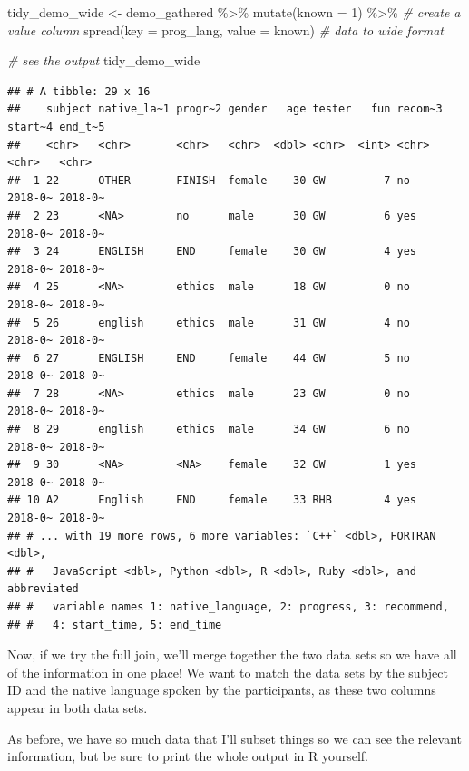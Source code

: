 \documentclass[
]{book}
\newenvironment{Shaded}{\begin{snugshade}}{\end{snugshade}}
\newcommand{\AttributeTok}[1]{\textcolor[rgb]{0.77,0.63,0.00}{#1}}
\newcommand{\CommentTok}[1]{\textcolor[rgb]{0.56,0.35,0.01}{\textit{#1}}}
\newcommand{\DecValTok}[1]{\textcolor[rgb]{0.00,0.00,0.81}{#1}}
\newcommand{\FunctionTok}[1]{\textcolor[rgb]{0.00,0.00,0.00}{#1}}
\newcommand{\NormalTok}[1]{#1}
\newcommand{\OtherTok}[1]{\textcolor[rgb]{0.56,0.35,0.01}{#1}}
\newcommand{\SpecialCharTok}[1]{\textcolor[rgb]{0.00,0.00,0.00}{#1}}
\begin{document}
\begin{Shaded}
\begin{Highlighting}[]
\NormalTok{tidy\_demo\_wide }\OtherTok{\textless{}{-}}\NormalTok{ demo\_gathered }\SpecialCharTok{\%\textgreater{}\%} 
  \FunctionTok{mutate}\NormalTok{(}\AttributeTok{known =} \DecValTok{1}\NormalTok{) }\SpecialCharTok{\%\textgreater{}\%} \CommentTok{\# create a value column}
  \FunctionTok{spread}\NormalTok{(}\AttributeTok{key =}\NormalTok{ prog\_lang, }\AttributeTok{value =}\NormalTok{ known) }\CommentTok{\# data to wide format}

\CommentTok{\# see the output}
\NormalTok{tidy\_demo\_wide}
\end{Highlighting}
\end{Shaded}

\begin{verbatim}
## # A tibble: 29 x 16
##    subject native_la~1 progr~2 gender   age tester   fun recom~3 start~4 end_t~5
##    <chr>   <chr>       <chr>   <chr>  <dbl> <chr>  <int> <chr>   <chr>   <chr>  
##  1 22      OTHER       FINISH  female    30 GW         7 no      2018-0~ 2018-0~
##  2 23      <NA>        no      male      30 GW         6 yes     2018-0~ 2018-0~
##  3 24      ENGLISH     END     female    30 GW         4 yes     2018-0~ 2018-0~
##  4 25      <NA>        ethics  male      18 GW         0 no      2018-0~ 2018-0~
##  5 26      english     ethics  male      31 GW         4 no      2018-0~ 2018-0~
##  6 27      ENGLISH     END     female    44 GW         5 no      2018-0~ 2018-0~
##  7 28      <NA>        ethics  male      23 GW         0 no      2018-0~ 2018-0~
##  8 29      english     ethics  male      34 GW         6 no      2018-0~ 2018-0~
##  9 30      <NA>        <NA>    female    32 GW         1 yes     2018-0~ 2018-0~
## 10 A2      English     END     female    33 RHB        4 yes     2018-0~ 2018-0~
## # ... with 19 more rows, 6 more variables: `C++` <dbl>, FORTRAN <dbl>,
## #   JavaScript <dbl>, Python <dbl>, R <dbl>, Ruby <dbl>, and abbreviated
## #   variable names 1: native_language, 2: progress, 3: recommend,
## #   4: start_time, 5: end_time
\end{verbatim}

Now, if we try the full join, we'll merge together the two data sets so we have all of the information in one place! We want to match the data sets by the subject ID and the native language spoken by the participants, as these two columns appear in both data sets.

As before, we have so much data that I'll subset things so we can see the relevant information, but be sure to print the whole output in R yourself.
\end{document}
